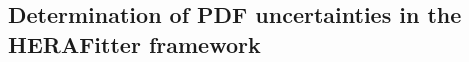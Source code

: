 %
%
%


\subsection{Determination of PDF uncertainties in the HERAFitter framework}
\label{section:treatment_pdf_uncertainties}

